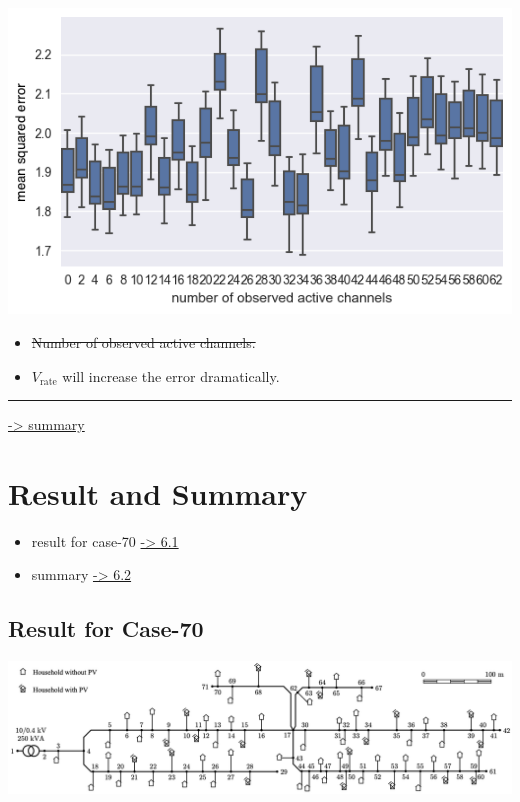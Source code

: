 \documentclass[
]{book}
\providecommand{\tightlist}{%
  \setlength{\itemsep}{0pt}\setlength{\parskip}{0pt}}
\begin{document}
\begin{center}\includegraphics{Pictures/figErrorObsBRM} \end{center}

\begin{itemize}
\tightlist
\item
  \sout{Number of observed active channels.}
\item
  \(V_\text{rate}\) will increase the error dramatically.
\end{itemize}

\begin{center}\rule{0.5\linewidth}{0.5pt}\end{center}

\protect\hyperlink{summary}{-\textgreater{} summary}

\hypertarget{result-and-summary}{%
\chapter{Result and Summary}\label{result-and-summary}}

\begin{itemize}
\tightlist
\item
  result for case-70 \protect\hyperlink{result}{-\textgreater{} 6.1}
\item
  summary \protect\hyperlink{summary}{-\textgreater{} 6.2}
\end{itemize}

\hypertarget{result}{%
\section{Result for Case-70}\label{result}}

\includegraphics{Pictures/case70true.png}
\end{document}
